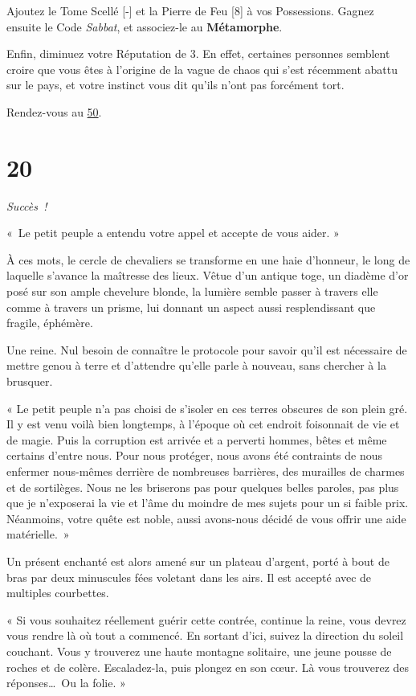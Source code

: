 \documentclass{report}
\newcommand{\gsection}[1]{
    \section{#1}
    \label{section-#1}
}
\newcommand{\glink}[1]{\hyperref[section-#1]{#1}}
\newcommand{\success}{\emph{Succès !}}
\newcommand{\hero}[1]{\textbf{#1}}
\begin{document}
Ajoutez le Tome Scellé [-] et la Pierre de Feu [8] à vos Possessions. Gagnez ensuite le Code \emph{Sabbat}, et associez-le au \hero{Métamorphe}.

Enfin, diminuez votre Réputation de 3. En effet, certaines personnes semblent croire que vous êtes à l'origine de la vague de chaos qui s'est récemment abattu sur le pays, et votre instinct vous dit qu'ils n'ont pas forcément tort.

Rendez-vous au \glink{50}.

\gsection{20}

\success

« Le petit peuple a entendu votre appel et accepte de vous aider. »

À ces mots, le cercle de chevaliers se transforme en une haie d'honneur, le long de laquelle s'avance la maîtresse des lieux. Vêtue d'un antique toge, un diadème d'or posé sur son ample chevelure blonde, la lumière semble passer à travers elle comme à travers un prisme, lui donnant un aspect aussi resplendissant que fragile, éphémère.

Une reine. Nul besoin de connaître le protocole pour savoir qu'il est nécessaire de mettre genou à terre et d'attendre qu'elle parle à nouveau, sans chercher à la brusquer.

« Le petit peuple n'a pas choisi de s'isoler en ces terres obscures de son plein gré. Il y est venu voilà bien longtemps, à l'époque où cet endroit foisonnait de vie et de magie. Puis la corruption est arrivée et a perverti hommes, bêtes et même certains d'entre nous. Pour nous protéger, nous avons été contraints de nous enfermer nous-mêmes derrière de nombreuses barrières, des murailles de charmes et de sortilèges. Nous ne les briserons pas pour quelques belles paroles, pas plus que je n'exposerai la vie et l'âme du moindre de mes sujets pour un si faible prix. Néanmoins, votre quête est noble, aussi avons-nous décidé de vous offrir une aide matérielle. »

Un présent enchanté est alors amené sur un plateau d'argent, porté à bout de bras par deux minuscules fées voletant dans les airs. Il est accepté avec de multiples courbettes.

« Si vous souhaitez réellement guérir cette contrée, continue la reine, vous devrez vous rendre là où tout a commencé. En sortant d'ici, suivez la direction du soleil couchant. Vous y trouverez une haute montagne solitaire, une jeune pousse de roches et de colère. Escaladez-la, puis plongez en son cœur. Là vous trouverez des réponses\dots~Ou la folie. »
\end{document}
